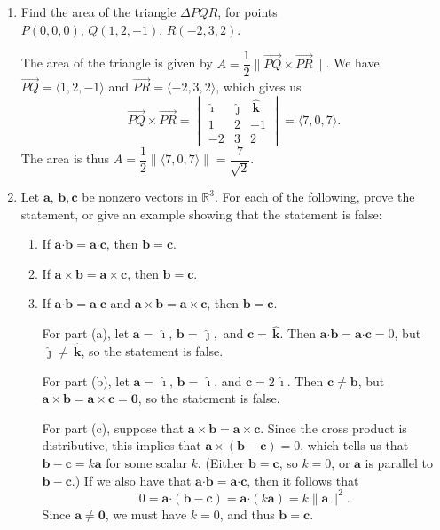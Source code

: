 \documentclass[12pt]{article}
\newcommand{\points}[1]{\marginpar{\hspace{24pt}[#1]}}
\newcommand{\R}{\mathbb{R}}
\newcommand{\aaa}{\mathbf{a}}
\newcommand{\bbb}{\mathbf{b}}
\newcommand{\ccc}{\mathbf{c}}
\newcommand{\dotp}{\boldsymbol{\cdot}}
\newcommand{\len}[1]{\lVert #1\rVert}
\newcommand{\ivec}{\,\boldsymbol{\hat{\imath}}}
\newcommand{\jvec}{\,\boldsymbol{\hat{\jmath}}}
\newcommand{\kvec}{\,\boldsymbol{\hat{k}}}
\begin{document}
\begin{enumerate}
\newpage

\item Find the area of the triangle $\Delta PQR$, for points $P(0,0,0),\, Q(1,2,-1),\, R(-2,3,2)$. \points{7}

\bigskip

The area of the triangle is given by $A = \dfrac{1}{2}\len{\overrightarrow{PQ}\times\overrightarrow{PR}}$. We have $\overrightarrow{PQ}=\langle 1,2,-1\rangle$ and $\overrightarrow{PR} = \langle -2,3,2\rangle$, which gives us
\[
\overrightarrow{PQ}\times\overrightarrow{PR} = \begin{vmatrix}
\ivec &\jvec & \kvec\\ 1& 2 & -1\\ -2&3&2
\end{vmatrix} = \langle 7,0,7\rangle.
\]
The area is thus $A=\dfrac{1}{2}\len{\langle 7,0,7\rangle} = \dfrac{7}{\sqrt{2}}$.

\bigskip

\bigskip

\bigskip

\bigskip




\item Let $\mathbf{a},\,\mathbf{b},\mathbf{c}$ be nonzero vectors in $\R^3$. For each of the following, prove the statement, or give an example showing that the statement is false: \points{6}
\begin{enumerate}
\item If $\aaa\dotp\bbb = \aaa\dotp\ccc$, then $\bbb=\ccc$.
\item If $\aaa\times\bbb = \aaa\times\ccc$, then $\bbb=\ccc$.
\item If $\aaa\dotp\bbb = \aaa\dotp\ccc$ and $\aaa\times\bbb = \aaa\times\ccc$, then $\bbb=\ccc$.


\bigskip

For part (a), let $\aaa = \ivec, \, \bbb = \jvec,$ and $\ccc = \kvec$. Then $\aaa\dotp\bbb = \aaa\dotp\ccc = 0$, but $\jvec\neq \kvec$, so the statement is false.

For part (b), let $\aaa = \ivec,\, \bbb = \ivec$, and $\ccc = 2\ivec$. Then $\ccc\neq \bbb$, but $\aaa\times\bbb = \aaa\times\ccc = \mathbf{0}$, so the statement is false.

For part (c), suppose that $\aaa\times\bbb=\aaa\times\ccc$. Since the cross product is distributive, this implies that $\aaa\times(\bbb-\ccc)=0$, which tells us that $\bbb-\ccc = k\aaa$ for some scalar $k$. (Either $\bbb=\ccc$, so $k=0$, or $\aaa$ is parallel to $\bbb-\ccc$.) If we also have that $\aaa\dotp\bbb = \aaa\dotp\ccc$, then it follows that 
\[
0 = \aaa\dotp(\bbb-\ccc) = \aaa\dotp (k\aaa) = k\len{\aaa}^2.
\]
Since $\aaa\neq \mathbf{0}$, we must have $k=0$, and thus $\bbb=\ccc$. 


\end{enumerate}


\end{enumerate}
\newpage
\end{document}

